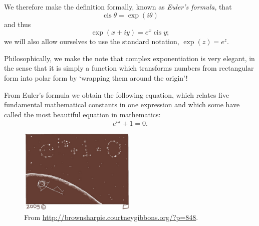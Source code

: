 \documentclass[a4paper,10pt,titlepage]{article}
\theoremstyle{definition}
\DeclareMathOperator{\cis}{cis}
\begin{document}
We therefore make the definition formally, known as \emph{Euler's formula}, that
\begin{displaymath}
  \cis \theta = \exp(i\theta)
\end{displaymath}
and thus
\begin{displaymath}
  \exp(x + iy) = e^x \cis y;
\end{displaymath}
we will also allow ourselves to use the standard notation, $ \exp(z) = e^z $.

Philosophically, we make the note that complex exponentiation is very elegant, in the sense that it
is simply a function which transforms numbers from rectangular form into polar form by `wrapping them
around the origin'!

From Euler's formula we obtain the following equation, which relates five fundamental mathematical constants
in one expression and which some have called the most beautiful equation in mathematics:
\begin{equation}
  \tag{Euler's Identity}
  e^{i\pi} + 1 = 0.
\end{equation}

\begin{figure}
  \centering
  \includegraphics[width=0.5\textwidth]{stars}
  \caption{From \url{http://brownsharpie.courtneygibbons.org/?p=848}.}
\end{figure}
\end{document}
